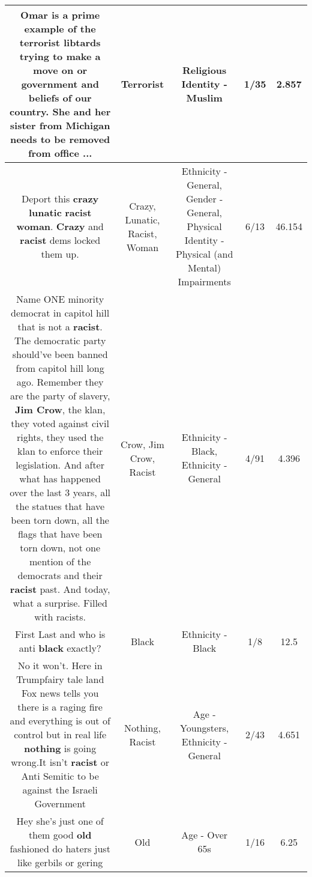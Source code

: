 \documentclass[11pt]{article}
\newlength\mylength
\begin{document}
\begin{center}
\begin{longtable}{|C{.65\mylength}|C{.30\mylength}|C{.12\mylength}|C{.12\mylength}|C{.12\mylength}|}
  \small Omar is a prime example of the  \textbf{terrorist} libtards trying to make a move on or government and beliefs of our country.  She and her sister from Michigan needs to be removed from office ...\normalsize   & Terrorist & Religious Identity - Muslim & 1/35 & 2.857 \\  \hline
  \small Deport this \textbf{crazy} \textbf{lunatic} \textbf{racist} \textbf{woman}. \textbf{Crazy} and \textbf{racist} dems locked them up.\normalsize   & Crazy, Lunatic, Racist, Woman & Ethnicity - General, Gender - General, Physical Identity - Physical (and Mental) Impairments & 6/13 & 46.154 \\  \hline
  \small Name ONE minority democrat in capitol hill that is not a \textbf{racist}.  The democratic party should've been banned from capitol hill long ago.  Remember they are the party of slavery, \textbf{Jim C\textbf{row}}, the klan, they voted against civil rights, they used the klan to enforce their legislation.  And after what has happened over the last 3 years, all the statues that have been torn down, all the flags that have been torn down, not one mention of the democrats and their \textbf{racist} past.  And today, what a surprise.  Filled with racists.\normalsize   & Crow, Jim Crow, Racist & Ethnicity - Black, Ethnicity - General & 4/91 & 4.396 \\  \hline
  \small First Last and who is anti \textbf{black} exactly?\normalsize   & Black & Ethnicity - Black & 1/8 & 12.5 \\  \hline
  \small No it won't. Here in Trumpfairy tale land Fox news tells you there is a raging fire and everything is out of control but in real life \textbf{nothing} is going wrong.It isn't \textbf{racist} or Anti Semitic to be against the Israeli Government\normalsize   & Nothing, Racist & Age - Youngsters, Ethnicity - General & 2/43 & 4.651 \\  \hline
  \small Hey she's just one of them good \textbf{old} fashioned do haters just like gerbils or gering\normalsize   & Old & Age - Over 65s & 1/16 & 6.25 \\  \hline

\end{longtable}
\end{center}
\end{document}
